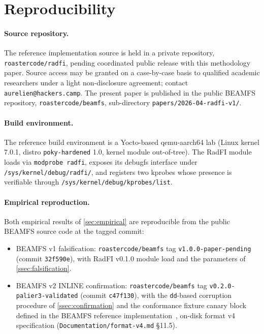 \section{Reproducibility}\label{sec:repro}

\paragraph{Source repository.}
The reference implementation source is held in a private repository,
\texttt{roastercode/radfi}, pending coordinated public release
with this methodology paper. Source access may be granted on a
case-by-case basis to qualified academic researchers under a light
non-disclosure agreement; contact
\texttt{aurelien@hackers.camp}. The present paper is published in
the public BEAMFS repository, \texttt{roastercode/beamfs},
sub-directory \texttt{papers/2026-04-radfi-v1/}.

\paragraph{Build environment.}
The reference build environment is a Yocto-based qemu-aarch64 lab
(Linux kernel 7.0.1, distro \texttt{poky-hardened} 1.0, kernel
module out-of-tree). The RadFI module loads via
\texttt{modprobe radfi}, exposes its debugfs interface under
\texttt{/sys/kernel/debug/radfi/}, and registers two kprobes whose
presence is verifiable through
\texttt{/sys/kernel/debug/kprobes/list}.

\paragraph{Empirical reproduction.}
Both empirical results of \cref{sec:empirical} are reproducible from
the public BEAMFS source code at the tagged commit:

\begin{itemize}
\item BEAMFS v1 falsification: \texttt{roastercode/beamfs} tag
  \texttt{v1.0.0-paper-pending} (commit \texttt{32f590e}), with
  RadFI v0.1.0 module load and the parameters of
  \cref{ssec:falsification}.
\item BEAMFS v2 INLINE confirmation: \texttt{roastercode/beamfs}
  tag \texttt{v0.2.0-palier3-validated} (commit \texttt{c47f130}),
  with the \texttt{dd}-based corruption procedure of
  \cref{ssec:confirmation} and the conformance fixture canary block
  defined in the BEAMFS reference
  implementation~\cite{beamfs-impl}, on-disk format v4
  specification (\texttt{Documentation/format-v4.md} \S 11.5).
\end{itemize}

